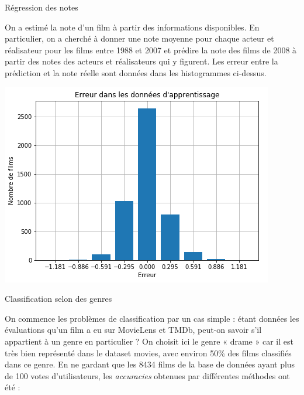 \documentclass[10pt]{article}
\theoremstyle{plain}
\theoremstyle{definition}
\numberwithin{table}{section}
\numberwithin{figure}{section}
\numberwithin{equation}{section}
\begin{document}
\begin{center}
{\begin{minipage}{21cm}
\begin{multicols}{3}
\bigskip

\begin{tcolorbox}[colback=blue!10, colframe=blue!75!black]
\centering\Large
Régression des notes
\end{tcolorbox}

On a estimé la note d'un film à partir des informations disponibles. En particulier, on a cherché à donner une note moyenne pour chaque acteur et réalisateur pour les films entre 1988 et 2007 et prédire la note des films de 2008 à partir des notes des acteurs et réalisateurs qui y figurent. Les erreur entre la prédiction et la note réelle sont données dans les histogrammes ci-dessus.

\includegraphics[width=\columnwidth]{regressionApprent}

\columnbreak

\begin{tcolorbox}[colback=blue!10, colframe=blue!75!black]
\centering\Large
Classification selon des genres
\end{tcolorbox}

On commence les problèmes de classification par un cas simple : étant données les évaluations qu’un film a eu sur MovieLens et TMDb, peut-on savoir s’il appartient à un genre en particulier ? On choisit ici le genre « drame » car il est très bien représenté dans le dataset movies, avec environ 50\% des films classifiés dans ce genre. En ne gardant que les 8434 films de la base de données ayant plus de 100 votes d'utilisateurs, les \emph{accuracies} obtenues par différentes méthodes ont été :

\medskip


\end{multicols}
\end{minipage}}
\end{center}
\end{document}
